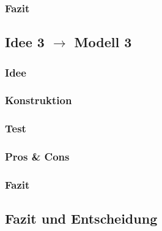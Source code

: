 \subsubsection{Fazit}
\subsection{Idee 3 $\rightarrow$ Modell 3}%
\subsubsection{Idee}
\subsubsection{Konstruktion}
\subsubsection{Test}
\subsubsection{Pros \& Cons}
\subsubsection{Fazit}
\subsection{Fazit und Entscheidung}
\section{}
